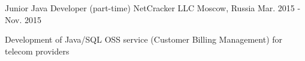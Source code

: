 \begin{cventries}

\cventry
{Junior Java Developer (part-time)} %
{NetCracker LLC} %
{Moscow, Russia} %
{Mar. 2015 - Nov. 2015} %
{ %
\begin{cvitems}
\item {Development of Java/SQL OSS service (Customer Billing Management) for telecom providers}
\end{cvitems}
}

\end{cventries}